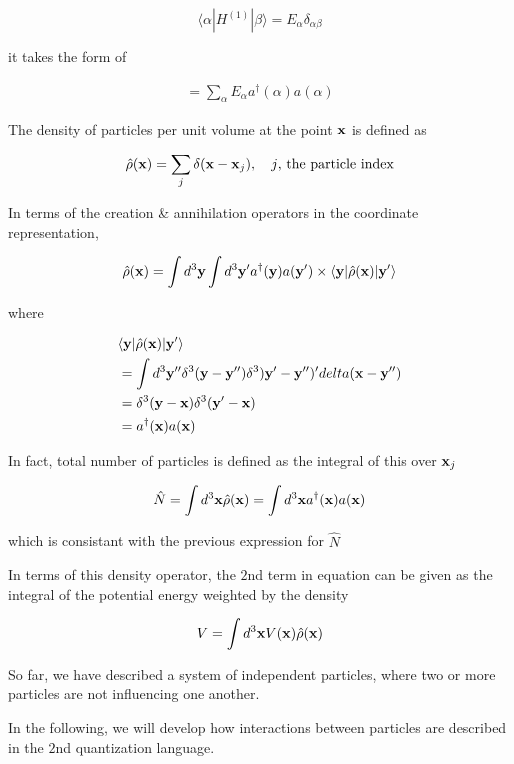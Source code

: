 \[\langle\alpha|H^{(1)}|\beta\rangle = E_\alpha\delta_{\alpha\beta} \]

it takes the form of

\begin{align}
=\sum_\alpha E_\alpha a^\dagger(\alpha)a(\alpha)
\end{align}

The density of particles per unit volume at the point $\bf x$ is defined as 

\[\hat{\rho}({\bf x}) = \sum_j\delta({\bf x - x}_j),\quad j\text{, the particle index} \]

In terms of the creation \& annihilation operators in the coordinate representation, 

\[\hat{\rho}({\bf x}) = \int d^3{\bf y}\int d^3{\bf y'}a^\dagger({\bf y})a({\bf y'})\times\langle{\bf y}|\hat{\rho}(\bf x)|y'\rangle \]

where

\begin{align}
\begin{split}
&\langle {\bf y}|\hat{\rho}({\bf x})|{\bf y'}\rangle\\
&=\int d^3{\bf y''}\delta^3({\bf y - y''})\delta^3){\bf y'-y''})'delta(\bf x - y'')\\
&=\delta^3({\bf y - x})\delta^3(\bf y' - x)\\
&=a^\dagger({\bf x})a(\bf x)
\end{split}
\end{align}

In fact, total number of particles is defined as the integral of this over ${\bf x}_j$

\begin{align}\label{eqs1.7.15}
\hat{N}=\int d^3{\bf x}\hat{\rho}({\bf x}) = \int d^3{\bf x}a^\dagger({\bf x})a(\bf x)
\end{align}

which is consistant with the previous expression for $\hat{N}$

In terms of this density operator, the $2$nd term in equation can be given as the integral of the potential energy weighted by the density

\[V = \int d^3{\bf x}V({\bf x})\hat{\rho}(\bf x) \]

So far, we have described a system of independent particles, where two or more particles are not influencing one another. 

In the following, we will develop how interactions between particles are described in the $2$nd quantization language. 

